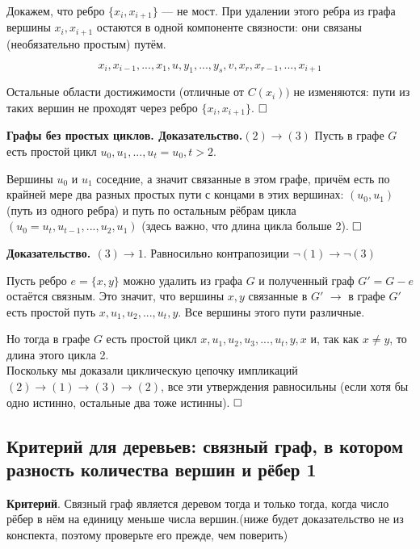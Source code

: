 \documentclass[a4paper, 10pt]{article}
\begin{document}
Докажем, что ребро $\{x_i, x_{i+1}\}$ — не мост. При удалении этого ребра из графа вершины $x_i, x_{i+1}$ остаются в одной компоненте связности: они связаны (необязательно простым) путём.

$$x_i, x_{i-1}, ... , x_1, u, y_1, ..., y_s, v, x_r, x_{r-1}, ... , x_{i+1}$$

Остальные области достижимости (отличные от $C(x_i))$ не изменяются: пути из таких вершин не проходят через ребро $\{x_i,x_{i+1}\}$. $\hfill \square$

\medskip


\textbf{Графы без простых циклов. Доказательство.$(2) \to (3)$}
 Пусть в графе $G$ есть простой цикл $u_0, u_1,...,u_t = u_0, t > 2$.

Вершины $u_0$ и $u_1$ соседние, а значит связанные в этом графе, причём есть по крайней мере два разных простых пути с концами в этих вершинах: $(u_0, u_1)$ (путь из одного ребра) и путь по остальным рёбрам цикла $(u_0 = u_t, u_{t-1}, . . . , u_2, u_1)$ (здесь важно, что длина цикла больше 2). $\hfill \square$

\medskip

\textbf{Доказательство. $(3) \to 1$}. Равносильно контрапозиции $\neg(1) \to \neg(3)$

Пусть ребро $e = \{x, y\}$ можно удалить из графа $G$ и полученный граф $G' = G - e$ остаётся связным. Это значит, что вершины $x, y$ связанные в $G'$ $\to$ в графе $G'$ есть простой путь $x, u_1, u_2, ..., u_t, y$. Все вершины этого пути различные.

Но тогда в графе $G$ есть простой цикл $x, u_1, u_2, u_3, ..., u_t, y, x$ и, так как $x \neq y$, то длина этого цикла 2. \\

Поскольку мы доказали циклическую цепочку импликаций $(2) \to (1) \to (3) \to (2)$, все эти утверждения равносильны (если хотя бы одно истинно, остальные два тоже истинны). $\hfill \square$


\subsection{Критерий для деревьев: связный граф, в котором разность количества вершин и рёбер 1}

\textbf{Критерий}. Связный граф является деревом тогда и только тогда, когда число рёбер в нём на единицу меньше числа вершин.(ниже будет доказательство не из конспекта, поэтому проверьте его прежде, чем поверить) \\
\end{document}
